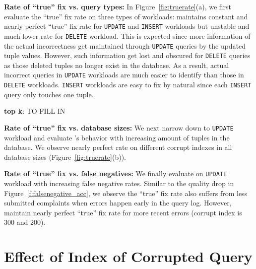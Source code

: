 \textbf{Rate of ``true'' fix vs. query types: } In Figure~\ref{fig:truerate}(a), we first evaluate the ``true'' fix rate on three types of workloads: \sys maintains constant and 
nearly perfect ``true'' fix rate for \texttt{UPDATE} and \texttt{INSERT} workloads but unstable and much lower rate for \texttt{DELETE} workload. This is expected since more information of the actual incorrectness get maintained through \texttt{UPDATE} queries by the updated tuple values. However, such information get lost and obscured for \texttt{DELETE} queries as those deleted tuples no longer exist in the database. As a result, actual incorrect queries in \texttt{UPDATE} workloads are much easier to identify than those in \texttt{DELETE} workloads. \texttt{INSERT} workloads are easy to fix by natural since each \texttt{INSERT} query only touches one tuple. 

\textbf{top k}: TO FILL IN


\textbf{Rate of ``true'' fix vs. database sizes: } We next narrow down to \texttt{UPDATE} workload and evaluate \sys's behavior with increasing amount of tuples in the database. We observe nearly perfect rate on different corrupt indexes in all database sizes (Figure~\ref{fig:truerate}(b)). 

\textbf{Rate of ``true'' fix vs. false negatives: } We finally evaluate \sys on \texttt{UPDATE} workload with increasing false negative rates. Similar to the quality drop in Figure~\ref{f:falsenegative_acc}, we observe the ``true'' fix rate also suffers from less submitted complaints when errors happen early in the query log. However, \sys maintain nearly perfect ``true'' fix rate for more recent errors (corrupt index is 300 and 200). 


\section{Effect of Index of Corrupted Query}
\label{app:qidx}


